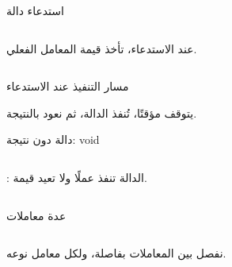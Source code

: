 \documentclass[aspectratio=169, 11pt, t, xcolor={table}]{beamer}
\begin{document}
\begin{frame}[t]{استدعاء دالة}
    \begin{columns}[T]
        {\small عند الاستدعاء، تأخذ  قيمة المعامل الفعلي.\par}
        \vspace{0.3cm}
    \end{columns}
\end{frame}

\begin{frame}{مسار التنفيذ عند الاستدعاء}
    \vspace{0.6cm}
    \begin{center}
    \end{center}
    \vspace{0.3cm}
    يتوقف  مؤقتًا، تُنفذ الدالة، ثم نعود بالنتيجة.
\end{frame}

\begin{frame}[t]{دالة دون نتيجة: \textenglish{void}}
    \begin{columns}[T]
        {\small {}: الدالة تنفذ عملًا ولا تعيد قيمة.\par}
        \vspace{0.3cm}
    \end{columns}
\end{frame}

\begin{frame}[t]{عدة معاملات}
    \begin{columns}[T]
        {\small نفصل بين المعاملات بفاصلة، ولكل معامل نوعه.\par}
        \vspace{0.3cm}
    \end{columns}
\end{frame}
\end{document}
